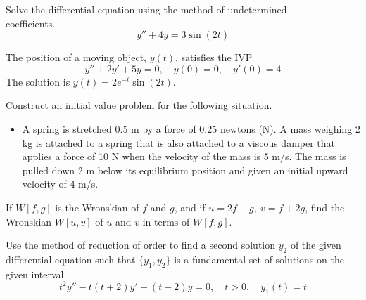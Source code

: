 \documentclass[12pt]{exam}
\begin{document}
\begin{questions}

    \newpage
    
    \question[8] Solve the differential equation using the method of undetermined \\coefficients. $$y'' + 4y = 3 \sin(2t)$$
    

    \newpage 
    

    \vspace{4cm} 
    
    \question[8] The position of a moving object, $y(t)$, satisfies the IVP $$y''+2y'+5y=0, \quad y(0) = 0, \quad y'(0) = 4$$ The solution is $y(t)= 2e^{-t}\sin(2t)$. 
    
    
    \newpage
    \question[4]  Construct an initial value problem for the following situation. 

    \begin{itemize}
        \item[] A spring is stretched 0.5 m by a force of 0.25 newtons (N). A mass weighing 2 kg is attached to a spring that is also attached to a viscous damper that applies a force of 10 N when the velocity of the mass is 5 m/s. The mass is pulled down 2 m below its equilibrium position and given an initial upward velocity of 4 m/s. 
    \end{itemize}
    
    \vspace{4cm} 
    
    \question[3] If $W[f, g]$ is the Wronskian of $f$ and $g$, and if $u=2f - g, \ v=f +2g$, find the Wronskian $W[u,v]$ of $u$ and $v$ in terms of $W [ f , g]$.

    \vspace{6cm} 
    
    \newpage
    
    \question[8] Use the method of reduction of order to find a second solution $y_2$ of the given differential equation such that $\{y_1, y_2\}$ is a fundamental set of solutions on the given interval. $$t^2y'' - t(t+2)y' + (t+2)y=0, \quad t > 0 , \quad y_1(t) = t$$
    
        
\end{questions}
\end{document}
